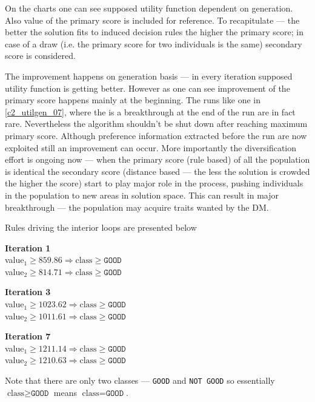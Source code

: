 On the charts one can see supposed utility function dependent on
generation. Also value of the primary score is included for reference. To
recapitulate --- the better the solution fits to induced decision rules the
higher the primary score; in case of a draw (i.e. the primary score for two
individuals is the same) secondary score is considered.

The improvement happens on generation basis --- in every iteration supposed
utility function is getting better. However as one can see improvement of the
primary score happens mainly at the beginning. The runs like one in
\ref{c2_utilgen_07}, where the is a breakthrough at the end of the run are in
fact rare. Nevertheless the algorithm shouldn't be shut down after reaching
maximum primary score. Although preference information extracted before the
run are now exploited still an improvement can occur. More importantly the
diversification effort is ongoing now --- when the primary score (rule based)
of all the population is identical the secondary score (distance based --- the
less the solution is crowded the higher the score) start to play major role in
the process, pushing individuals in the population to new areas in solution
space. This can result in major breakthrough --- the population may acquire
traits wanted by the DM.

Rules driving the interior loops are presented below

\begin{description}
  \item{\textbf{Iteration 1}} \\
    value$_1 \ge 859.86 \Rightarrow \text{class} \ge \texttt{GOOD}$ \\
    value$_2 \ge 814.71 \Rightarrow \text{class} \ge \texttt{GOOD}$
  \item{\textbf{Iteration 3}} \\
    value$_1 \ge 1023.62 \Rightarrow \text{class} \ge \texttt{GOOD}$ \\
    value$_2 \ge 1011.61 \Rightarrow \text{class} \ge \texttt{GOOD}$
  \item{\textbf{Iteration 7}} \\
    value$_1 \ge 1211.14 \Rightarrow \text{class} \ge \texttt{GOOD}$ \\
    value$_2 \ge 1210.63 \Rightarrow \text{class} \ge \texttt{GOOD}$
\end{description}

Note that there are only two classes --- \texttt{GOOD} and \texttt{NOT GOOD}
so essentially $\text{class} \ge \texttt{GOOD}$ means $\text{class} =
\texttt{GOOD}$.

